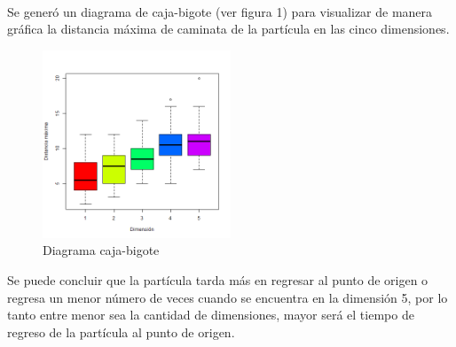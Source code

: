 \documentclass[12pt]{amsart}
\begin{document}
\\
\bigskip
\bigskip
\bigskip
\bigskip
\bigskip
Se generó un diagrama de caja-bigote (ver figura 1) para visualizar de manera gráfica la distancia máxima de caminata de la partícula en las cinco dimensiones.
\bigskip
\begin{figure}[h!]
    \centering
    \includegraphics[width=0.5\textwidth]{p1mr.png}
    \caption{\label{fig1}Diagrama caja-bigote}
    \label{fig:figura1}
\end{figure}

Se puede concluir que la partícula tarda más en regresar al punto de origen o regresa un menor número de veces cuando se encuentra en la dimensión 5, por lo tanto entre menor sea la cantidad de dimensiones, mayor será el tiempo de regreso de la partícula al punto de origen.
\bigskip
\bigskip
\bigskip
\bigskip
\bigskip
\bigskip




\bigskip
\end{document}
